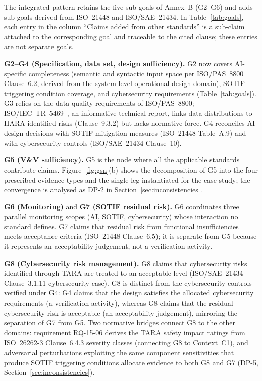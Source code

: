 \documentclass[runningheads]{llncs}
\newcommand{\new}[1]{#1}
\newcommand{\new}[1]{\textcolor{blue}{#1}}
\newcommand{\crev}[1]{\textcolor{blue!75!black}{#1}}
\newcommand{\crev}[1]{#1}
\begin{document}
	The integrated pattern retains the five sub-goals of Annex~B (G2--G6) and adds sub-goals derived from ISO~21448 and ISO/SAE~21434. \crev{In Table~\ref{tab:goals}, each entry in the column ``Claims added from other standards'' is a sub-claim attached to the corresponding goal and traceable to the cited clause; these entries are not separate goals.}
	
	\textbf{G2--G4 (Specification, data set, design sufficiency).} G2 now covers AI-specific completeness (semantic and syntactic input space per ISO/PAS~8800 Clause~6.2, derived from the system-level operational design domain), SOTIF triggering condition coverage, and cybersecurity requirements (Table~\ref{tab:goals}). \crev{G3 relies on the data quality requirements of ISO/PAS~8800;} ISO/IEC~TR~5469~\cite{TR5469}, an informative technical report, links data distributions to HARA-identified risks (Clause~9.3.2) but lacks normative force. G4 reconciles AI design decisions with SOTIF mitigation measures (ISO~21448 Table~A.9) and with cybersecurity controls (ISO/SAE~21434 Clause~10).
	
	\textbf{G5 (V\&V sufficiency).} G5 is the node where all the applicable standards contribute claims. \crev{Figure~\ref{fig:gsn}(b) shows the decomposition of G5 into the four prescribed evidence types and the single leg instantiated for the case study;} the convergence is analysed as DP-2 in Section~\ref{sec:inconsistencies}.
	
	\textbf{G6 (Monitoring)} and \textbf{G7 (SOTIF residual risk).} G6 coordinates three parallel monitoring scopes (AI, SOTIF, cybersecurity) whose interaction no standard defines. G7 claims that residual risk from functional insufficiencies meets acceptance criteria (ISO~21448 Clause~6.5); it is separate from G5 because it represents an acceptability judgement, not a verification activity.
	
	\textbf{G8 (Cybersecurity risk management).} G8 claims that cybersecurity risks identified through TARA are treated to an acceptable level (ISO/SAE~21434 Clause~3.1.11 cybersecurity case). \crev{G8 is distinct from the cybersecurity controls verified under G4: G4 claims that the design satisfies the allocated cybersecurity requirements (a verification activity), whereas G8 claims that the residual cybersecurity risk is acceptable (an acceptability judgement), mirroring the separation of G7 from G5.} \new{Two normative bridges connect G8 to the other domains: requirement RQ-15-06 derives the TARA safety impact ratings from ISO~26262-3 Clause~6.4.3 severity classes (connecting G8 to Context~C1), and adversarial perturbations exploiting the same component sensitivities that produce SOTIF triggering conditions allocate evidence to both G8 and G7 (DP-5, Section~\ref{sec:inconsistencies}).}
	
\end{document}
